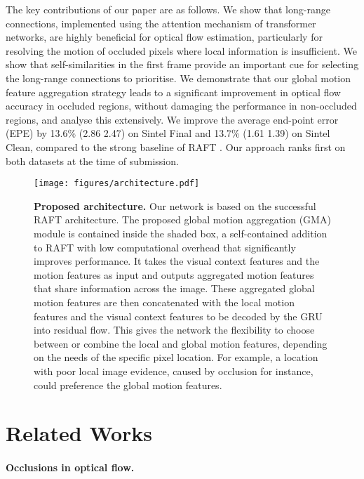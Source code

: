 \documentclass[10pt,twocolumn,letterpaper]{article}
\begin{document}
The key contributions of our paper are as follows.
We show that long-range connections, implemented using the attention mechanism of transformer networks,
are highly beneficial for optical flow estimation, particularly for resolving the motion of occluded pixels
where local information is insufficient.
We show that self-similarities in the first frame provide an important cue for selecting the long-range connections
to prioritise.
We demonstrate that our global motion feature aggregation strategy leads to a significant improvement in optical flow accuracy in occluded regions, without damaging the performance in non-occluded regions, and analyse this extensively.
We improve the average end-point error (EPE) by 13.6\% (2.86  2.47) on Sintel Final and 13.7\% (1.61  1.39) on Sintel Clean, compared to the strong baseline of RAFT \cite{raft}.
Our approach ranks first on both datasets at the time of submission. 

\begin{figure*}[t!]
    \centering
    \texttt{[image: figures/architecture.pdf]}
    \caption{
    \textbf{Proposed architecture.}
    Our network is based on the successful RAFT \cite{raft} architecture.
    The proposed global motion aggregation (GMA) module is contained inside
    the shaded box, a self-contained addition to RAFT with low computational overhead
    that significantly improves performance.
    It takes the visual context features and the motion features as input
    and outputs aggregated motion features that share information across the image.
    These aggregated global motion features are then concatenated with the local motion 
    features and the visual context features to be decoded by the GRU into residual flow.
    This gives the network the flexibility to choose between or combine the local and global
    motion features, depending on the needs of the specific pixel location. For example,
    a location with poor local image evidence, caused by occlusion for instance, could preference the
    global motion features.
    }
    \label{fig:overall}
\end{figure*} 
\section{Related Works}
\label{Sec:related}

\paragraph{Occlusions in optical flow.}
\end{document}
